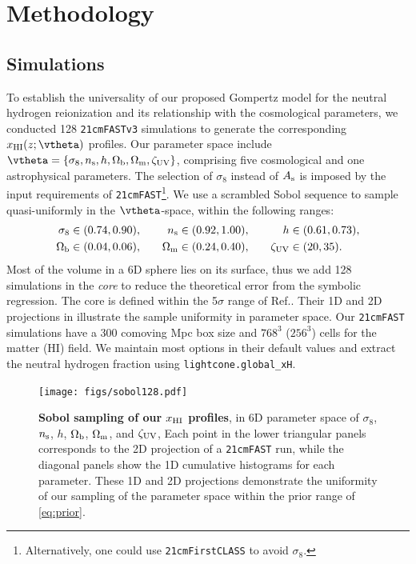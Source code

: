 \section*{Methodology}
\label{sec:methods}


\subsection*{Simulations}
\label{ssec:sims}

To establish the universality of our proposed Gompertz model for the
neutral hydrogen reionization and its relationship with the cosmological
parameters, we conducted 128 \texttt{21cmFASTv3} simulations to generate
the corresponding $x_\HI(z; \vtheta)$ profiles. 
Our parameter space include $\vtheta = \{\sigma_8, \ns, h, \Omegab,
\Omegam, \zetaUV\}$, comprising five cosmological and one astrophysical
parameters.
The selection of $\sigma_8$ instead of $A_\mathrm{s}$ is imposed by the input
requirements of \texttt{21cmFAST}\footnote{Alternatively, one could use
\texttt{21cmFirstCLASS}\cite{Flitter2024} to avoid $\sigma_8$.}.
We use a scrambled Sobol sequence \cite{Sobol1967, Owen1998} to sample
quasi-uniformly in the $\vtheta$-space, within the following ranges:
%
\begin{alignat}{3}
\label{eq:prior}
\sigma_8 &\in (0.74, 0.90), &\quad
n_\mathrm{s} &\in (0.92, 1.00), &\quad
h &\in (0.61, 0.73), \nonumber\\
\Omega_\mathrm{b} &\in (0.04, 0.06), &\quad
\Omega_\mathrm{m} &\in (0.24, 0.40), &\quad
\zeta_\mathrm{UV} &\in (20, 35).
\end{alignat}
%
Most of the volume in a 6D sphere lies on its surface, thus we add 128
simulations in the \emph{core} to reduce the theoretical error from the symbolic 
regression. The core is defined within the 5$\sigma$ range of Ref.\cite{Planck2020a}. 
Their 1D and 2D projections in  illustrate the sample
uniformity in parameter space.
Our \texttt{21cmFAST} simulations have a 300 comoving Mpc box size and
$768^3$ ($256^3$) cells for the matter (HI) field.
We maintain most options in their default values and extract the
neutral hydrogen fraction using \texttt{lightcone.global\_xH}.

\begin{figure}[tb]
\centering
\texttt{[image: figs/sobol128.pdf]}
\caption{\textbf{Sobol sampling of our $x_{\mathrm{HI}}$ profiles}, in 6D
parameter space of $\sigma_8$, $n_\mathrm{s}$, $h$, $\Omega_\mathrm{b}$, $\Omega_\mathrm{m}$, and
$\zeta_\mathrm{UV}$,
Each point in the lower triangular panels corresponds to the 2D
projection of a \texttt{21cmFAST} run, while the diagonal panels show
the 1D cumulative histograms for each parameter.
These 1D and 2D projections demonstrate the uniformity of our sampling
of the parameter space within the prior range of \cref{eq:prior}.}
\label{fig:sobol}
\end{figure}

